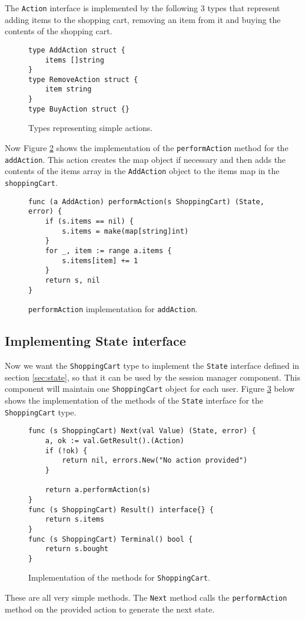 The \texttt{Action} interface is implemented by the following 3 types
that represent adding items to the shopping cart, removing an item from it
and buying the contents of the shopping cart.
\begin{figure}[h]
\begin{lstlisting}
type AddAction struct {
    items []string
}
type RemoveAction struct {
    item string
}
type BuyAction struct {}
\end{lstlisting}
\caption[scale=1.0]{Types representing simple actions.}
\label{fig:actions}
\end{figure}

Now Figure \ref{fig:addAction} shows the implementation of the \texttt{performAction}
method for the \texttt{addAction}. This action creates the map object if 
necessary and then adds the contents of the items array in the \texttt{AddAction}
object to the items map in the \texttt{shoppingCart}.
\begin{figure}[h]
\begin{lstlisting}
func (a AddAction) performAction(s ShoppingCart) (State, error) {
    if (s.items == nil) {
        s.items = make(map[string]int)
    }
    for _, item := range a.items {
        s.items[item] += 1
    }
    return s, nil
}
\end{lstlisting}
\caption[scale=1.0]{\texttt{performAction} implementation for \texttt{addAction}.}
\label{fig:addAction}
\end{figure}

\subsection{Implementing State interface}
Now we want the \texttt{ShoppingCart} type to implement the \texttt{State} 
interface defined in section
\ref{sec:state}, so that it can be used by the session manager component.
This component will maintain one \texttt{ShoppingCart} object for each user.
Figure \ref{fig:shoppingCartImpl} below shows the implementation of the 
methods of the \texttt{State} interface for the \texttt{ShoppingCart} type.
\begin{figure}[h]
\begin{lstlisting}
func (s ShoppingCart) Next(val Value) (State, error) {
    a, ok := val.GetResult().(Action)
    if (!ok) {
        return nil, errors.New("No action provided")
    }

    return a.performAction(s)
}
func (s ShoppingCart) Result() interface{} {
    return s.items
}
func (s ShoppingCart) Terminal() bool {
    return s.bought
}
\end{lstlisting}
\caption[scale=1.0]{Implementation of the methods for \texttt{ShoppingCart}.}
\label{fig:shoppingCartImpl}
\end{figure}
These are all very simple methods. The \texttt{Next} method calls 
the \texttt{performAction} method on the provided action to generate 
the next state.

